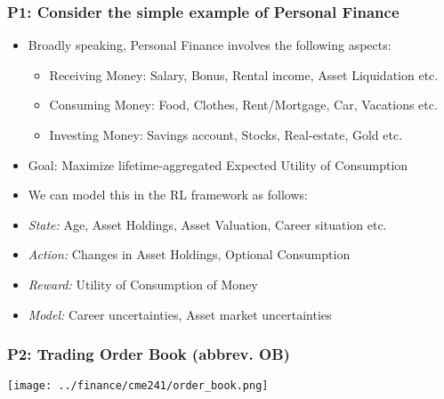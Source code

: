 \documentclass[handout]{beamer}
\begin{document}
\begin{frame}
\frametitle{P1: Consider the simple example of Personal Finance}
\pause
\begin{itemize}[<+->]
\item Broadly speaking, Personal Finance involves the following aspects:
\pause
\begin{itemize}[<+->]
\item Receiving Money: Salary, Bonus, Rental income, Asset Liquidation etc.
\item Consuming Money: Food, Clothes, Rent/Mortgage, Car, Vacations etc.
\item Investing Money: Savings account, Stocks, Real-estate, Gold etc.
\end{itemize}
\item Goal: Maximize lifetime-aggregated Expected Utility of Consumption
\item We can model this in the RL framework as follows:
\item {\em State:} Age, Asset Holdings, Asset Valuation, Career situation etc.
\item {\em Action:} Changes in Asset Holdings, Optional Consumption
\item {\em Reward:} Utility of Consumption of Money
\item {\em Model:} Career uncertainties, Asset market uncertainties
\end{itemize}
\end{frame}


\begin{frame}
\frametitle{P2: Trading Order Book (abbrev. OB)}
\texttt{[image: ../finance/cme241/order\_book.png]}
\end{frame}
\end{document}
